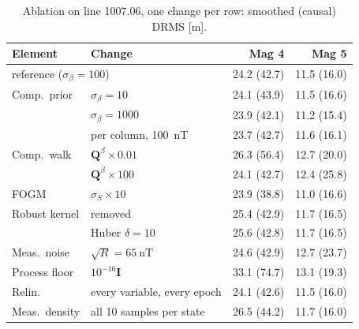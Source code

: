 \documentclass{IEEEtaes}
\begin{document}
\begin{table}[t]
\caption{Ablation on line 1007.06, one change per row: smoothed (causal) DRMS [m].}
\label{tab:ablation}
\centering
\setlength{\tabcolsep}{4pt}
\begin{tabular}{l l rr}
\toprule
Element & Change & Mag 4 & Mag 5 \\
\midrule
\multicolumn{2}{l}{reference ($\sigma_{\beta}=100$)} & 24.2 (42.7) & 11.5 (16.0) \\
\midrule
Comp.\ prior & $\sigma_{\beta}=10$ & 24.1 (43.9) & 11.5 (16.6) \\
 & $\sigma_{\beta}=1000$ & 23.9 (42.1) & 11.2 (15.4) \\
 & per column, \SI{100}{\nano\tesla} & 23.7 (42.7) & 11.6 (16.1) \\
Comp.\ walk & $\mathbf{Q}^{\beta}\times0.01$ & 26.3 (56.4) & 12.7 (20.0) \\
 & $\mathbf{Q}^{\beta}\times100$ & 24.1 (42.7) & 12.4 (25.8) \\
FOGM & $\sigma_S\times10$ & 23.9 (38.8) & 11.0 (16.6) \\
Robust kernel & removed & 25.4 (42.9) & 11.7 (16.5) \\
 & Huber $\delta=10$ & 25.6 (42.8) & 11.7 (16.5) \\
Meas.\ noise & $\sqrt{R}=\SI{65}{\nano\tesla}$ & 24.6 (42.9) & 12.7 (23.7) \\
Process floor & $10^{-16}\mathbf{I}$ & 33.1 (74.7) & 13.1 (19.3) \\
Relin. & every variable, every epoch & 24.1 (42.6) & 11.5 (16.0) \\
Meas.\ density & all \num{10} samples per state & 26.5 (44.2) & 11.7 (16.0) \\
\bottomrule
\end{tabular}
\end{table}
\end{document}
